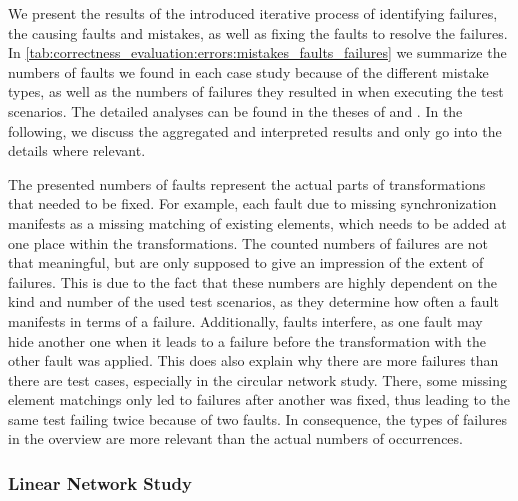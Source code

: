 We present the results of the introduced iterative process of identifying failures, the causing faults and mistakes, as well as fixing the faults to resolve the failures.
In \autoref{tab:correctness_evaluation:errors:mistakes_faults_failures} we summarize the numbers of faults we found in each case study because of the different mistake types, as well as the numbers of failures they resulted in when executing the test scenarios.
The detailed analyses can be found in the theses of \textcite{syma2018ma} and \textcite{saglam2020ma}.
In the following, we discuss the aggregated and interpreted results and only go into the details where relevant.

The presented numbers of faults represent the actual parts of transformations that needed to be fixed.
For example, each fault due to missing synchronization manifests as a missing matching of existing elements, which needs to be added at one place within the transformations.
The counted numbers of failures are not that meaningful, but are only supposed to give an impression of the extent of failures.
This is due to the fact that these numbers are highly dependent on the kind and number of the used test scenarios, as they determine how often a fault manifests in terms of a failure.
Additionally, faults interfere, as one fault may hide another one when it leads to a failure before the transformation with the other fault was applied.
This does also explain why there are more failures than there are test cases, especially in the circular network study.
There, some missing element matchings only led to failures after another was fixed, thus leading to the same test failing twice because of two faults.
In consequence, the types of failures in the overview are more relevant than the actual numbers of occurrences.

\subsubsection*{Linear Network Study} 

